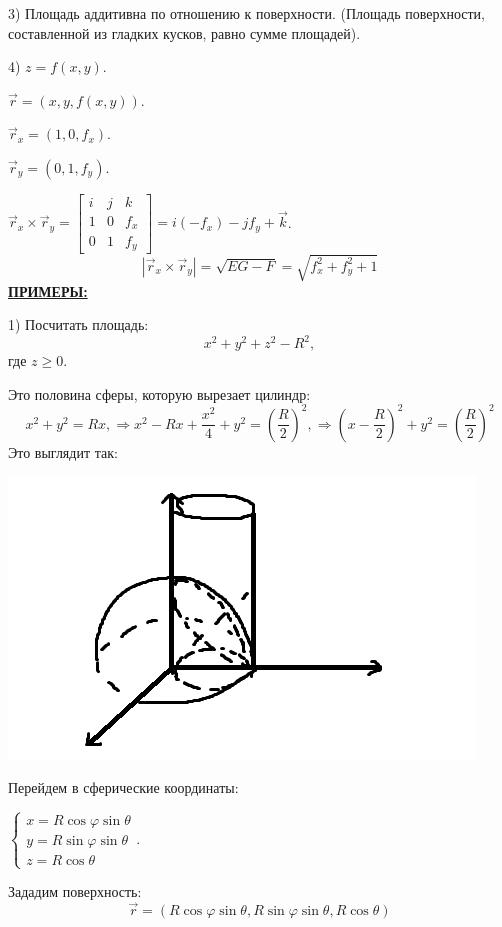 \documentclass[12pt]{article}
\begin{document}
3) Площадь аддитивна по отношению к поверхности. (Площадь поверхности, составленной из гладких кусков, равно сумме площадей).\par
4) $z = f(x,y)$.\par
$\overrightarrow{r} = (x,y,f(x,y))$.\par
$\overrightarrow{r}_x = (1,0,f_x)$.\par
$\overrightarrow{r}_y = (0,1,f_y)$.\par
$\overrightarrow{r}_x \times \overrightarrow{r}_y = \begin{bmatrix} i & j & k \\ 1 & 0 & f_x \\ 0 & 1 & f_y \end{bmatrix} = i (-f_x) - j f_y + \overrightarrow{k}$.
$$|\overrightarrow{r}_x \times \overrightarrow{r}_y| = \sqrt{EG - F} = \sqrt{f_x^2 + f_y^2 +1}$$
\uline{\textbf{ПРИМЕРЫ:}}\par
1) Посчитать площадь:
$$x^2 + y^2 + z^2 - R^2,$$
где $z \geq 0$.\par
Это половина сферы, которую вырезает цилиндр:
$$x^2 + y^2 = Rx, \Rightarrow x^2 - Rx + \frac{x^2}{4} + y^2 = (\frac{R}{2})^2, \Rightarrow (x-\frac{R}{2})^2 + y^2 = (\frac{R}{2})^2$$
Это выглядит так:\par
\includegraphics{halfSphereAndCylindr1}\par
Перейдем в сферические координаты:\par
$\begin{cases} x = R\cos\varphi \sin\theta \\ y = R \sin \varphi \sin \theta \\ z = R \cos \theta \end{cases}$.\par
Зададим поверхность:
$$\overrightarrow{r} = (R\cos\varphi \sin\theta, R\sin\varphi \sin\theta, R\cos\theta)$$
\end{document}

